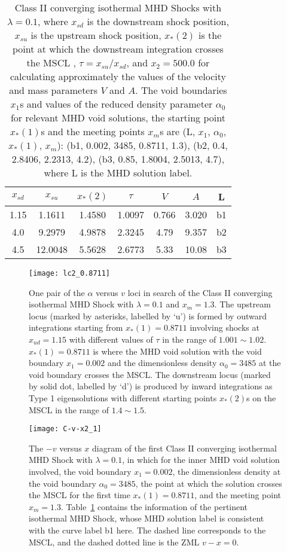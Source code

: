 \documentclass[fleqn,usenatbib]{mnras}
\begin{document}
\begin{table}
  \centering
  \caption{Class II converging isothermal MHD Shocks with $\lambda=0.1$, where $x_{sd}$ is the downstream shock position, $x_{su}$ is the upstream shock position, $x_{*}(2)$ is the point at which the downstream integration crosses the MSCL 
, $\tau=x_{su}/x_{sd}$, and $x_{2}=500.0$ for calculating approximately the values of the velocity and mass parameters $V$ and $A$. The void boundaries $x_{1}$s and values of the reduced density parameter $\alpha_{0}$ for relevant MHD void solutions, the starting point $x_{*}(1)$s and the meeting points $x_{m}$s are (L, $x_{1}$, $\alpha_{0}$, $x_{*}(1)$, $x_{m}$): (b1, 0.002, 3485, 0.8711, 1.3), (b2, 0.4, 2.8406, 2.2313, 4.2), (b3, 0.85, 1.8004, 2.5013, 4.7), where L is the MHD solution label.}
    \begin{tabular}{ccccccc}
    \hline
    $x_{sd}$ & $x_{su}$ & $x_{*}(2)$ & $\tau$ & $V$ & $A$ & L\\
    \hline
    1.15 & 1.1611 & 1.4580 & 1.0097 & 0.766 & 3.020 & b1\\
    4.0 & 9.2979 & 4.9878 & 2.3245 & 4.79 & 9.357 & b2\\
    4.5 & 12.0048 & 5.5628 & 2.6773 & 5.33 & 10.08 & b3\\
    \hline
    \end{tabular}
    \label{t3}
\end{table}    

\begin{figure}
\centering
\texttt{[image: lc2\_0.8711]}
\caption{One pair of the $\alpha$ versus $v$ loci in search of the Class II converging isothermal MHD Shock with $\lambda=0.1$ and $x_{m}=1.3$. The upstream locus (marked by asterisks, labelled by `u') is formed by outward integrations starting from $x_{*}(1)=0.8711$ involving shocks at $x_{ud}=1.15$ with different values of $\tau$ in the range of $1.001\sim 1.02$. $x_{*}(1)=0.8711$ is where the MHD void solution with the void boundary $x_{1}=0.002$ and the dimensionless density $\alpha_{0}=3485$ at the void boundary crosses the MSCL. The downstream locus (marked by solid dot, labelled by `d') is produced by inward integrations as Type 1 eigensolutions with different starting points $x_{*}(2)$s on the MSCL in the range of $1.4\sim 1.5$.}
\label{10}
\end{figure}

\begin{figure}
\centering
\texttt{[image: C-v-x2\_1]}
\caption{The $-v$ versus $x$ diagram of the first Class II converging isothermal MHD Shock with $\lambda=0.1$, in which for the inner MHD void solution involved, the void boundary $x_{1}=0.002$, the dimensionless density at the void boundary $\alpha_{0}=3485$, the point at which the solution crosses the MSCL for the first time $x_{*}(1)=0.8711$, and the meeting point $x_{m}=1.3$. Table~\ref{t3} contains the information of the pertinent isothermal MHD Shock, whose MHD solution label is consistent with the curve label b1 here. The dashed line corresponds to the MSCL, and the dashed dotted line is the ZML $v-x=0$.}
\label{11}
\end{figure}
\end{document}
